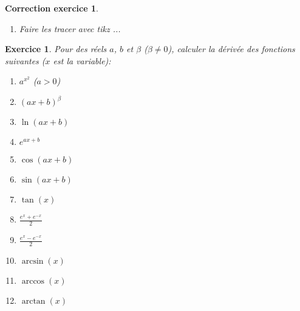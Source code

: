 \documentclass[12pt]{article}
\newtheorem{exercice}{\bf Exercice}
\newtheorem{correction}{\bf Correction exercice}
\newenvironment{exo}{
\begin{exercice}\smallskip\normalfont}{\end{exercice}
}
\newenvironment{cor}{
\begin{correction}\smallskip\normalfont}{\end{correction}
}
\newif\ifcorrige\corrigetrue
\begin{document}
\ifcorrige
\color{magenta}
\begin{cor}
$\qquad$
\begin{enumerate}
\item Faire les tracer avec tikz ...
\end{enumerate}
\end{cor}
\color{black}
\fi



\begin{exo} Pour des r\'eels $a$, $b$ et $\beta$ ($\beta \neq 0$), calculer la d\'eriv\'ee des fonctions suivantes ($x$ est la variable):
\begin{multicols}{4}
\begin{enumerate}
\item $a^{x^2}$ ($a>0$)
\item $(ax+b)^{\beta}$
\item $\ln(ax+b)$
\item $e^{ax+b}$
\item $\cos(ax+b)$
\item $\sin(ax+b)$
\item $\tan(x)$
\item $\frac{e^x + e^{-x}}{2}$
\item $\frac{e^x - e^{-x}}{2}$
\item $\arcsin(x)$
\item $\arccos(x)$
\item $\arctan(x)$
\end{enumerate}
\end{multicols}
\end{exo}
\end{document}
